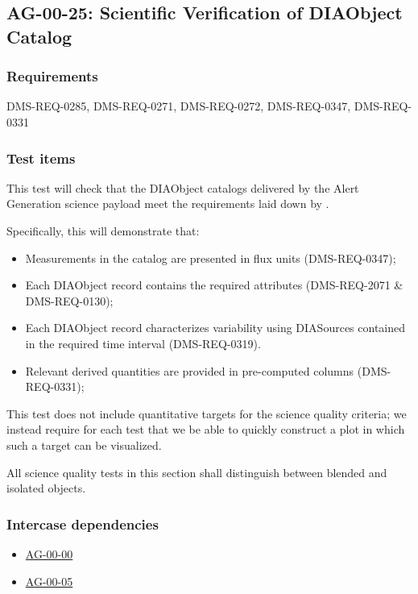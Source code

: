 \subsection{AG-00-25: Scientific Verification of DIAObject Catalog}
\label{AG-00-25}

\subsubsection{Requirements}

DMS-REQ-0285, DMS-REQ-0271, DMS-REQ-0272, DMS-REQ-0347, DMS-REQ-0331

\subsubsection{Test items}
\label{ag-00-25-items}

This test will check that the DIAObject catalogs delivered by the Alert
Generation science
payload meet the requirements laid down by .

Specifically, this will demonstrate that:

\begin{itemize}

  \item{Measurements in the catalog are presented in flux units
  (DMS-REQ-0347);}
\item{Each DIAObject record contains the required attributes (DMS-REQ-2071 \&
	DMS-REQ-0130);}
\item{Each DIAObject record characterizes variability using
	DIASources contained in the required time interval
	(DMS-REQ-0319).}
 \item{Relevant derived quantities are provided in pre-computed columns
  (DMS-REQ-0331);}
\end{itemize}

This test does not include quantitative targets for the science quality criteria; we instead require for each test that we be able to quickly construct a plot in which such a target can be visualized.

All science quality tests in this section shall distinguish between blended and isolated objects.

\subsubsection{Intercase dependencies}

\begin{itemize}

  \item{\hyperref[ag-00-00]{AG-00-00}}
  \item{\hyperref[ag-00-05]{AG-00-05}}

\end{itemize}


